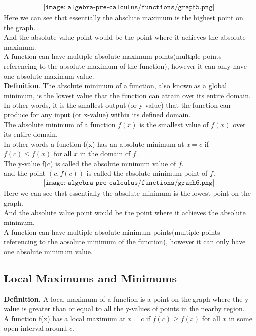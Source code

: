 \begin{align*}\texttt{[image: algebra-pre-calculus/functions/graph5.png]}\end{align*}
Here we can see that essentially the absolute maximum is the highest point on the graph. \\
And the absolute value point would be the point where it achieves the absolute maximum. \\
A function can have multiple absolute maximum points(multiple points referencing to the absolute maximum of the function), however it can only have one absolute maximum value. \\

\textbf{Definition}. The absolute minimum of a function, also known as a global minimum, is the lowest value that the function can attain over its entire domain. In other words, it is the smallest output (or y-value) that the function can produce for any input (or x-value) within its defined domain. \\
The absolute minimum of a function $f(x)$ is the smallest value of $f(x)$ over its entire domain. \\
In other words a function f(x) has an absolute minimum at $x = c$ if $f(c) \le f(x)$ for all $x$ in the domain of $f$. \\
The y-value f(c) is called the absolute minimum value of $f$. \\
and the point $(c, f(c))$ is called the absolute minimum point of $f$. \\

\begin{align*}\texttt{[image: algebra-pre-calculus/functions/graph6.png]}\end{align*}
Here we can see that essentially the absolute minimum is the lowest point on the graph. \\
And the absolute value point would be the point where it achieves the absolute minimum. \\
A function can have multiple absolute minimum points(multiple points referencing to the absolute minimum of the function), however it can only have one absolute minimum value. \\
\newpage
\subsection{Local Maximums and Minimums}
\textbf{Definition.} A local maximum of a function is a point on the graph where the y-value is greater than or equal to all the y-values of points in the nearby region. \\
A function f(x) has a local maximum at $x = c$ if $f(c) \ge f(x)$ for all $x$ in some open interval around $c$. \\

